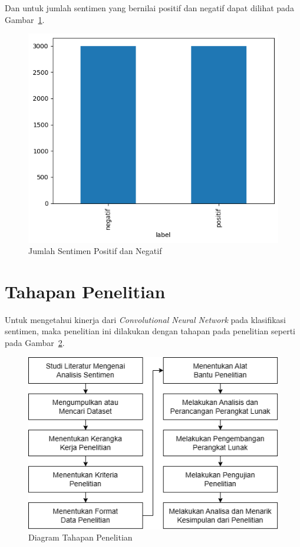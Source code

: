 Dan untuk jumlah sentimen yang bernilai positif dan negatif dapat dilihat pada Gambar~\ref{fig:bar_pos_neg}.
\begin{figure}[H]
  \centering
  \includegraphics[scale=0.5]{assets/bar_pos_neg.png}
  \caption{Jumlah Sentimen Positif dan Negatif}
  \label{fig:bar_pos_neg}
\end{figure}

\section{Tahapan Penelitian}
Untuk mengetahui kinerja dari \emph{Convolutional Neural Network} pada klasifikasi sentimen, maka
penelitian ini dilakukan dengan tahapan pada penelitian seperti pada Gambar~\ref{fig:diagram_tahapan_penelitian}.

\begin{figure}[H]
  \centering
  \includegraphics[scale=0.59]{assets/diagram_tahapan_penelitian.png}
  \caption{Diagram Tahapan Penelitian}
  \label{fig:diagram_tahapan_penelitian}
\end{figure}

